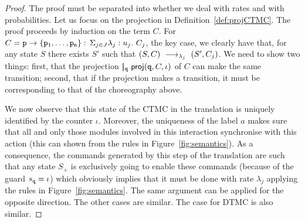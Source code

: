 \begin{proof} The proof must be separated into whether we deal with
  rates and with probabilities. Let us focus on the projection in
  Definition~\ref{def:projCTMC}. The proof proceeds by induction on
  the term $C$. For $C=\mathtt{p}\rightarrow \{\mathtt{\mathtt{p}_1,\ldots,\mathtt{p}_n}\}:\,\Sigma_{j\in J}\lambda_j: u_j.\ C_j$, the
  key case, we clearly have that, for any state $S$ there exists $S'$
  such that $(S,C)\ \longrightarrow_{\lambda_j}\ (S',C_j)$. We need to show two
  things: first, that the projection
  $|\!|_{\mathtt{q}}\ \mathsf{proj}{(\mathtt{q},C,\iota)}$ of $C$ can make the same
  transition; second, that if the projection makes a transition, it
  must be corresponding to that of the choreography above.

  We now observe that this state of the CTMC in the translation is
  uniquely identified by the counter $\iota$. 
  Moreover, the uniqueness of the label $a$ makes sure that all and
  only those modules involved in this interaction synchronise with
  this action (this can shown from the rules in
  Figure~\ref{fig:semantics}).  As a consequence, the commands
  generated by this step of the translation are such that any state
  $S_+$ is exclusively going to enable these commands (because of the
  guard $s_{\mathtt{q}}=\iota$) which obviously implies that it must be
  done with rate $\lambda_j$ applying the rules in
  Figure~\ref{fig:semantics}. The same argument can be applied for the
  opposite direction. 
  The other cases are similar. The case for DTMC is also similar.






\end{proof}
